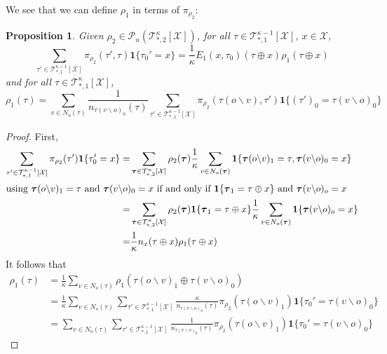 \documentclass[12pt]{article}
\newtheorem{proposition}[theorem]{Proposition}
\newcommand{\TB}{{ \boldsymbol\tau}}
\newcommand{\X}{{\mathcal{X}}}
\newcommand{\TT}{{\mathcal{T}}}
\newcommand{\one}[1]{\mathbf{1}\{#1\}}
\newcommand{\tree}[2]{\TT_{*, #1}^{#2}[\X]}
\numberwithin{equation}{section}
\begin{document}
We see that we can define $\rho_1$ in terms of $\pi_{\rho_2}$:
\begin{proposition}
    Given $\rho_2\in \mathcal{P}_u(\mathcal{T}_{*, 2}^\kappa[\mathcal{X}])$, for all $\tau\in \mathcal{T}_{*, 1}^{\kappa-1}[\mathcal{X}]$, $x\in \mathcal{X}$,
    \begin{equation}\label{Eq.NNNI-rho1-in-pi-rho2}
        \sum_{\tau'\in\tree{1}{\kappa-1}}\pi_{\rho_2}(\tau',\tau)\one{\tau_0'=x} = \frac1\kappa E_1(x, \tau_0)(\tau\oplus x) \rho_1(\tau\oplus x)
    \end{equation}
    and for all $\tau\in \mathcal{T}_{*, 1}^{\kappa}[\mathcal{X}]$,
    \begin{equation}\label{Eq.NNNI-rho1-in-pi-rho2-2}
        \rho_1(\tau) = \sum_{v\in N_o(\tau)}\frac1{n_{\tau(v\backslash o)_0}(\tau)}\sum_{\tau'\in\tree{1}{\kappa-1}}\pi_{\rho_2}(\tau(o\backslash v), \tau')\one{(\tau')_0=\tau(v\backslash o)_0}
    \end{equation}
\end{proposition}

\begin{proof}
    First,
    \begin{align*}
        \sum_{\tau'\in\tree{1}{\kappa-1}}\pi_{\rho_2}(\tau')\one{\tau_0'=x}
        = & \sum_{\TB\in\tree{2}{\kappa}}\rho_2(\TB)\frac1\kappa \sum_{v\in N_o(\TB)}\one{\TB(o\backslash v)_1 = \tau, \TB(v\backslash o)_0=x} \\
        \intertext{using $\TB(o\backslash v)_1 = \tau$ and $\TB(v\backslash o)_0=x$ if and only if $\one{\TB_1 = \tau\oplus x}
            $ and $\TB(v\backslash o)_o=x$}
        = & \sum_{\TB\in\tree{2}{\kappa}}\rho_2(\TB)\one{\TB_1 = \tau\oplus x} \frac1\kappa \sum_{v\in N_o(\TB)}\one{\TB(v\backslash o)_o=x}   \\
        = & \frac1\kappa n_x(\tau\oplus x)\rho_1(\tau\oplus x)
    \end{align*}
    It follows that
    \begin{align*}
        \rho_1(\tau) & = \frac1\kappa\sum_{v\in N_o(\tau)}\rho_1(\tau(o\backslash v)_1\oplus \tau(v\backslash o)_0)                                                                                               \\
                     & = \frac1\kappa\sum_{v\in N_o(\tau)}\sum_{\tau'\in\tree{1}{\kappa-1}}\frac{\kappa}{ n_{\tau(v\backslash o)_0}(\tau)}\pi_{\rho_2}(\tau(o\backslash v)_1)\one{\tau_0'= \tau(v\backslash o)_0} \\
                     & = \sum_{v\in N_o(\tau)}\sum_{\tau'\in\tree{1}{\kappa-1}}\frac{1}{n_{\tau(v\backslash o)_0}(\tau)}\pi_{\rho_2}(\tau(o\backslash v)_1)\one{\tau_0'= \tau(v\backslash o)_0}
    \end{align*}
\end{proof}
\end{document}
